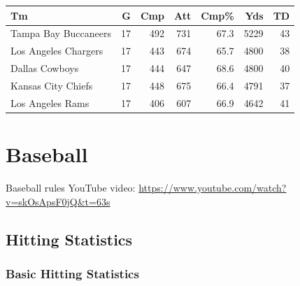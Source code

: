 \documentclass[
  11pt,
]{book}
\theoremstyle{definition}
\theoremstyle{definition}
\theoremstyle{definition}
\theoremstyle{definition}
\theoremstyle{remark}
\begin{document}
\begin{table}[H]
\centering
\begin{tabular}{lrrrrrr}
\toprule
Tm & G & Cmp & Att & Cmp\% & Yds & TD\\
\midrule
Tampa Bay Buccaneers & 17 & 492 & 731 & 67.3 & 5229 & 43\\
Los Angeles Chargers & 17 & 443 & 674 & 65.7 & 4800 & 38\\
Dallas Cowboys & 17 & 444 & 647 & 68.6 & 4800 & 40\\
Kansas City Chiefs & 17 & 448 & 675 & 66.4 & 4791 & 37\\
Los Angeles Rams & 17 & 406 & 607 & 66.9 & 4642 & 41\\
\bottomrule
\end{tabular}
\end{table}

\newpage

\hypertarget{baseball}{%
\section{Baseball}\label{baseball}}

Baseball rules YouTube video: \url{https://www.youtube.com/watch?v=skOsApsF0jQ\&t=63s}

\hypertarget{hitting-statistics}{%
\subsection{Hitting Statistics}\label{hitting-statistics}}

\hypertarget{basic-hitting-statistics}{%
\subsubsection{Basic Hitting Statistics}\label{basic-hitting-statistics}}
\end{document}
